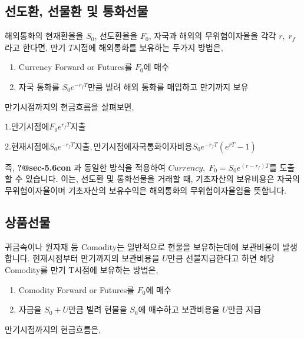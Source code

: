 \documentclass[
  letterpaper,
  DIV=11,
  numbers=noendperiod]{scrreprt}
\providecommand{\tightlist}{%
  \setlength{\itemsep}{0pt}\setlength{\parskip}{0pt}}\usepackage{longtable,booktabs,array}
\begin{document}
\subsection*{선도환, 선물환 및
통화선물}\label{uxc120uxb3c4uxd658-uxc120uxbb3cuxd658-uxbc0f-uxd1b5uxd654uxc120uxbb3c}

해외통화의 현재환율을 \(S_0\), 선도환율을 \(F_0\), 자국과 해외의
무위험이자율을 각각 \(r,\;r_f\)라고 한다면, 만기 \(T\)시점에 해외통화를
보유하는 두가지 방법은,

\begin{enumerate}
\def\labelenumi{\arabic{enumi}.}
\tightlist
\item
  Currency Forward or Futures를 \(F_0\)에 매수
\item
  자국 통화를 \(S_0e^{-r_fT}\)만큼 빌려 해외 통화를 매입하고 만기까지
  보유
\end{enumerate}

만기시점까지의 현금흐름을 살펴보면,

\(1. 만기시점에 F_0e^{r_fT} 지출\)

\(2. 현재시점에 S_0e^{-r_fT} 지출, 만기시점에 자국통화 이자비용 S_0e^{-r_fT}(e^{rT}-1)\)

즉, \textbf{?@sec-5.6con} 과 동일한 방식을 적용하여
\(Currency,\;F_0=S_0e^{(r-r_f)T}\)를 도출할 수 있습니다. 이는, 선도환 및
통화선물을 거래할 때, 기초자산의 보유비용은 자국의 무위험이자율이며
기초자산의 보유수익은 해외통화의 무위험이자율임을 뜻합니다.

\subsection*{상품선물}\label{uxc0c1uxd488uxc120uxbb3c}

귀금속이나 원자재 등 Comodity는 일반적으로 현물을 보유하는데에
보관비용이 발생합니다. 현재시점부터 만기까지의 보관비용을 \(U\)만큼
선불지급한다고 하면 해당 Comodity를 만기 T시점에 보유하는 방법은,

\begin{enumerate}
\def\labelenumi{\arabic{enumi}.}
\tightlist
\item
  Comodity Forward or Futures를 \(F_0\)에 매수
\item
  자금을 \(S_0+U\)만큼 빌려 현물을 \(S_0\)에 매수하고 보관비용을
  \(U\)만큼 지급
\end{enumerate}

만기시점까지의 현금흐름은,
\end{document}
